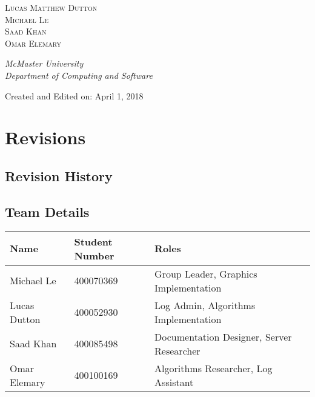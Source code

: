 \documentclass[12pt]{article}
\begin{document}
\begin{titlepage}
	{\scshape\Large Lucas Matthew Dutton \\ Michael Le \\ Saad Khan \\ Omar Elemary\\}
	
	\vspace{0.5\baselineskip} 
	
	\textit{McMaster University \\ Department of Computing and Software} 
	
	\vfill
	
	
	Created and Edited on: April 1, 2018 

\end{titlepage}

\tableofcontents

\newpage

\section{Revisions}

\subsection{Revision History}


\newpage

\subsection{Team Details}

\begin{table}[h]
\begin{tabular}{| l | l | l |}
\hline
\textbf{Name} & \textbf{Student Number} & \textbf{Roles} \\ 
\hline
Michael Le & 400070369 & Group Leader, Graphics Implementation\\ 
\hline
Lucas Dutton & 400052930 & Log Admin, Algorithms Implementation\\ 
\hline
Saad Khan & 400085498 & Documentation Designer, Server Researcher\\ 
\hline
Omar Elemary & 400100169 & Algorithms Researcher, Log Assistant\\ 
\hline
\end{tabular}
\end{table}
\end{document}
